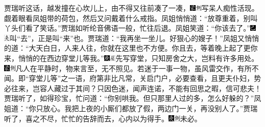 贾瑞听这话，越发撞在心坎儿上，由不得又往前凑了一凑，{\includegraphics[width=3mm]{../Images/00006}\includegraphics[width=3mm]{../Images/00011}\footnotesize \kaishu 写呆人痴性活现。}觑着眼看凤姐带的荷包，然后又问戴着什么戒指。凤姐悄悄道：``放尊重着，别叫丫头们看了笑话。''贾瑞如听纶音佛语一般，忙往后退。凤姐笑道：``你该去了。''{\includegraphics[width=3mm]{../Images/00003}\includegraphics[width=3mm]{../Images/00012}\footnotesize \kaishu 叫``去''，正是叫``来''也。}贾瑞道：``我再坐一坐儿。好狠心的嫂子！''凤姐又悄悄的道：``大天白日，人来人往，你就在这里也不方便。你且去，等着晚上起了更你来，悄悄的在西边穿堂儿等我。''{{\includegraphics[width=3mm]{../Images/00004}\includegraphics[width=3mm]{../Images/00010}\footnotesize \kaishu 先写穿堂，只知房舍之大，岂料有许多用处。　}\includegraphics[width=3mm]{../Images/00006}\includegraphics[width=3mm]{../Images/00011}\footnotesize \kaishu 凡人在平静时，物来言至，无不照见。若迷于一事一物，虽风雷交作，有所不闻。即``穿堂儿等''之一语，府第非比凡常，关启门户，必要查看，且更夫仆妇，势必往来，岂容人藏过于其间？只因色迷，闻声连诺，不能有回思之暇，信可悲夫！}贾瑞听了，如得珍宝，忙问道：``你别哄我。但只那里人过的多，怎么好躲的？''凤姐道：``你只放心。我把上夜的小厮们都放了假，两边门一关，再没别人了。''贾瑞听了，喜之不尽，忙忙的告辞而去，心内以为得手。{\includegraphics[width=3mm]{../Images/00004}\includegraphics[width=3mm]{../Images/00011}\footnotesize \kaishu 未必。}

